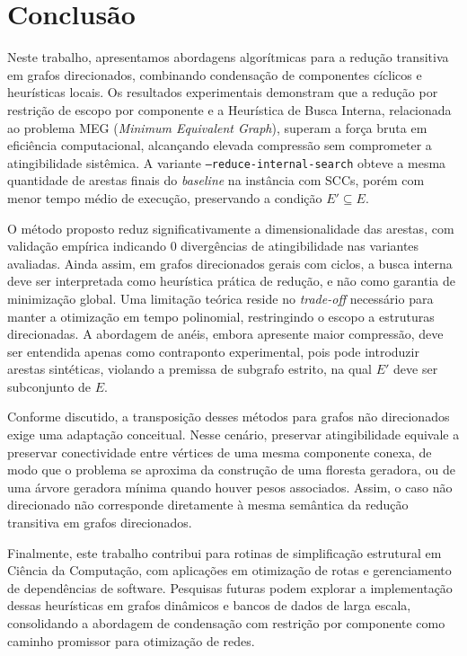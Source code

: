 \documentclass{sbc2023}%
\begin{document}
\section{Conclusão}

Neste trabalho, apresentamos abordagens algorítmicas para a redução transitiva em grafos direcionados, combinando condensação de componentes cíclicos e heurísticas locais. Os resultados experimentais demonstram que a redução por restrição de escopo por componente e a Heurística de Busca Interna, relacionada ao problema MEG (\textit{Minimum Equivalent Graph}), superam a força bruta em eficiência computacional, alcançando elevada compressão sem comprometer a atingibilidade sistêmica. A variante \texttt{--reduce-internal-search} obteve a mesma quantidade de arestas finais do \textit{baseline} na instância com SCCs, porém com menor tempo médio de execução, preservando a condição $E' \subseteq E$.

O método proposto reduz significativamente a dimensionalidade das arestas, com validação empírica indicando 0 divergências de atingibilidade nas variantes avaliadas. Ainda assim, em grafos direcionados gerais com ciclos, a busca interna deve ser interpretada como heurística prática de redução, e não como garantia de minimização global. Uma limitação teórica reside no \textit{trade-off} necessário para manter a otimização em tempo polinomial, restringindo o escopo a estruturas direcionadas. A abordagem de anéis, embora apresente maior compressão, deve ser entendida apenas como contraponto experimental, pois pode introduzir arestas sintéticas, violando a premissa de subgrafo estrito, na qual $E'$ deve ser subconjunto de $E$.

Conforme discutido, a transposição desses métodos para grafos não direcionados exige uma adaptação conceitual. Nesse cenário, preservar atingibilidade equivale a preservar conectividade entre vértices de uma mesma componente conexa, de modo que o problema se aproxima da construção de uma floresta geradora, ou de uma árvore geradora mínima quando houver pesos associados. Assim, o caso não direcionado não corresponde diretamente à mesma semântica da redução transitiva em grafos direcionados.

Finalmente, este trabalho contribui para rotinas de simplificação estrutural em Ciência da Computação, com aplicações em otimização de rotas e gerenciamento de dependências de software. Pesquisas futuras podem explorar a implementação dessas heurísticas em grafos dinâmicos e bancos de dados de larga escala, consolidando a abordagem de condensação com restrição por componente como caminho promissor para otimização de redes.



\end{document}
